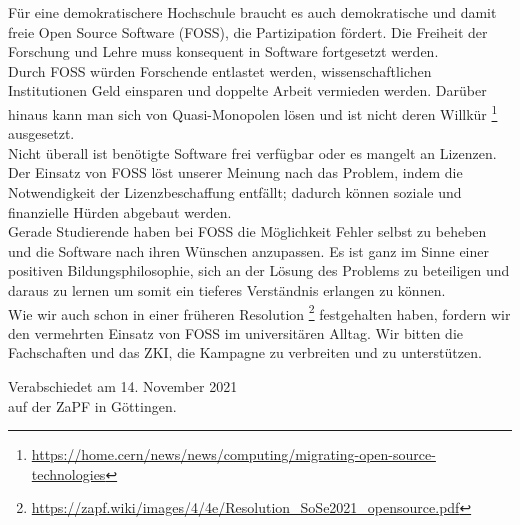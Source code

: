 \documentclass[DIV=calc]{scrartcl}
\begin{document}
Für eine demokratischere Hochschule braucht es auch demokratische und damit freie Open Source Software (FOSS), die Partizipation fördert. Die Freiheit der Forschung und Lehre muss konsequent in Software fortgesetzt werden.\\
Durch FOSS würden Forschende entlastet werden, wissenschaftlichen Institutionen Geld einsparen und doppelte Arbeit vermieden werden. Darüber hinaus kann man sich von Quasi-Monopolen lösen und ist nicht deren Willkür \footnote{\url{https://home.cern/news/news/computing/migrating-open-source-technologies}} ausgesetzt. \\
Nicht überall ist benötigte Software frei verfügbar oder es mangelt an Lizenzen. Der Einsatz von FOSS löst unserer Meinung nach das Problem, indem die Notwendigkeit der Lizenzbeschaffung entfällt; dadurch können soziale und finanzielle Hürden abgebaut werden.\\
Gerade Studierende haben bei FOSS die Möglichkeit Fehler selbst zu beheben und die Software nach ihren Wünschen anzupassen. Es ist ganz im Sinne einer positiven Bildungsphilosophie, sich an der Lösung des Problems zu beteiligen und daraus zu lernen um somit ein tieferes Verständnis erlangen zu können.\\
Wie wir auch schon in einer früheren Resolution \footnote{\url{https://zapf.wiki/images/4/4e/Resolution_SoSe2021_opensource.pdf}} festgehalten haben, fordern wir den vermehrten Einsatz von FOSS im universitären Alltag.
Wir bitten die Fachschaften und das ZKI, die Kampagne zu verbreiten und zu unterstützen.


\vfill
\begin{flushright}
	Verabschiedet am 14. November 2021 \\
	auf der ZaPF in Göttingen.
\end{flushright}
\end{document}
